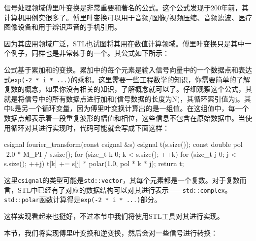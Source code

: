 信号处理领域傅里叶变换是非常重要和著名的公式。这个公式发现于200年前，其计算机用例实很多了。傅里叶变换可以用于音频/图像/视频压缩、音频滤波、医疗图像设备和用于辨识声音的手机引用。

因为其应用领域广泛，STL也试图将其用在数值计算领域。傅里叶变换只是其中一个例子，同样也是非常棘手的一个。其公式如下所示：


公式基于累加和的变换。累加中的每个元素是输入信号向量中的一个数据点和表达式\texttt{exp(-2 * i * ...)}的乘积。这里需要一些工程数学的知识，你需要简单的了解复数的概念，如果你没有相关的知识，了解概念就可以了。仔细观察这个公式，其就是将信号中的所有数据点进行加和(信号数据的长度为N)，其循环索引值为j。其中k是另一个循环变量，因为傅里叶变换计算出的是一组值。在这组值中，每一个数据点都表示着一段重复波形的幅值和相位，这些信息不包含在原始数据中。当使用循环对其进行实现时，代码可能就会写成下面这样：

\begin{codebox}[cpp]
csignal fourier_transform(const csignal &s) {
    csignal t(s.size());
    const double pol {-2.0 * M_PI / s.size()};
    for (size_t k {0}; k < s.size(); ++k) {
        for (size_t j {0}; j < s.size(); ++j) {
            t[k] += s[j] * polar(1.0, pol * k * j);
        }
    }
    return t;
}
\end{codebox}

这里\texttt{csignal}的类型可能是\texttt{std::vector}，其每个元素都是一个复数。对于复数而言，STL中已经有了对应的数据结构可以对其进行表示——\texttt{std::complex}。\texttt{std::polar}函数计算得是\texttt{exp(-2 * i * ...)}部分。

这样实现看起来也挺好，不过本节中我们将使用STL工具对其进行实现。


本节，我们将实现傅里叶变换和逆变换，然后会对一些信号进行转换：

